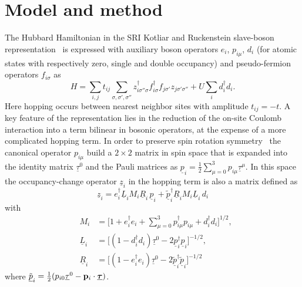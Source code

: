 \documentclass[showpacs,amsmath,twocolumn,floatfix]{revtex4-1}
\begin{document}
\section{Model and method} \label{sec:method}
The Hubbard Hamiltonian in the SRI Kotliar and Ruckenstein slave-boson 
representation~\cite{Kot86,fresard12} is expressed with auxiliary boson 
operators $e_i$, $p_{i\mu}$, $d_i$ (for atomic states with respectively zero, 
single and double occupancy) and pseudo-fermion operators $f_{i\sigma}$ as
\begin{equation} \label{eq:model}
 H = \sum_{i,j} t_{ij}\sum_{\sigma, \sigma', \sigma''} z_{i\sigma'' \sigma}^{\dagger} 
 f_{i\sigma}^{\dagger} f_{j\sigma'} z_{j\sigma' \sigma''} + U \sum_i d_i^{\dagger} d_i.
\end{equation}
Here hopping occurs between nearest neighbor sites with amplitude 
$t_{ij}=-t$. A key feature of the representation lies in the reduction of 
the on-site Coulomb interaction into a term bilinear in bosonic operators, 
at the expense of a more complicated hopping term. In order to preserve 
spin rotation symmetry~\cite{Li89,FW} the canonical operator $p_{i\mu}$ 
build a $2\times2$ matrix in spin space that is expanded into the 
identity matrix $\underline{\tau}^0$ and the Pauli matrices as 
${\underline p}_i = \frac{1}{2} \sum_{\mu=0}^3 p_{i\mu} {\underline \tau}^{\mu}$. 
In this space the occupancy-change operator $\underline{z}_i$ in the 
hopping term is also a matrix defined as
\begin{equation}
 {\underline z}_i = e_i^{\dagger} {\underline L}_i M_i {\underline R}_i \, 
 {\underline p}_i + {\underline {\tilde{p}}}_i^{\dagger} {\underline R}_i M_i  
 {\underline L}_i \, d_i
\end{equation}
with 
\begin{eqnarray}
& M_i & = \Big[ 1 + e_i^{\dagger} e_i + \sum_{\mu=0}^3 p_{i\mu}^{\dagger} p_{i\mu} 
+  d_i^{\dagger} d_i \Big]^{1/2}, \nonumber \\
&{\underline L}_i & = \Big[ (1 -d_i^{\dagger} d_i) {\underline \tau}^0 
- 2 {\underline p}_i^{\dagger} {\underline p}_i \Big]^{-1/2}, \nonumber \\  
& {\underline R}_i & = \Big[ (1 - e_i^{\dagger} e_i) {\underline \tau}^0 
- 2 {\tilde{\underline p}}_i^{\dagger} {\tilde{\underline p}}_i \Big]^{-1/2}          
\end{eqnarray}
where  $\tilde{\underline p}_i = \frac{1}{2} ( p_{i0} {\underline \tau}^0 
- {\bf p}_i \cdot \boldsymbol{\underline \tau} )$.
\end{document}

